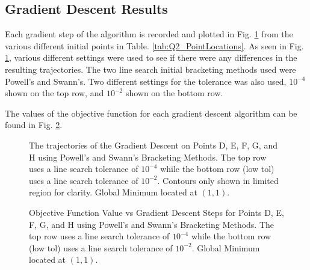 \documentclass{article}
\begin{document}
    \subsection{Gradient Descent Results}

    Each gradient step of the algorithm is recorded and plotted in Fig. \ref{fig:Q2_GradientDescentSteps} from the various different initial points in Table. \ref{tab:Q2_PointLocations}.
    As seen in Fig. \ref{fig:Q2_GradientDescentSteps}, various different settings were used to see if there were any differences in the resulting trajectories. 
    The two line search initial bracketing methods used were Powell's and Swann's.
    Two different settings for the tolerance was also used, $10^{-4}$ shown on the top row, and $10^{-2}$ shown on the bottom row.

    The values of the objective function for each gradient descent algorithm can be found in Fig. \ref{fig:Q2_Loss_vs_Steps}.

    \begin{figure}[H]
        \centering
        
        \caption{The trajectories of the Gradient Descent on Points D, E, F, G, and H using Powell's and Swann's Bracketing Methods. The top row uses a line search tolerance of $10^{-4}$ while the bottom row (low tol) uses a line search tolerance of $10^{-2}$. Contours only shown in limited region for clarity. Global Minimum located at $(1,1)$.}
        \label{fig:Q2_GradientDescentSteps}
    \end{figure}

    \begin{figure}[H]
        \centering
        
        \caption{Objective Function Value vs Gradient Descent Steps for Points D, E, F, G, and H using Powell's and Swann's Bracketing Methods. The top row uses a line search tolerance of $10^{-4}$ while the bottom row (low tol) uses a line search tolerance of $10^{-2}$. Global Minimum located at $(1,1)$.}
        \label{fig:Q2_Loss_vs_Steps}
    \end{figure}
\end{document}
